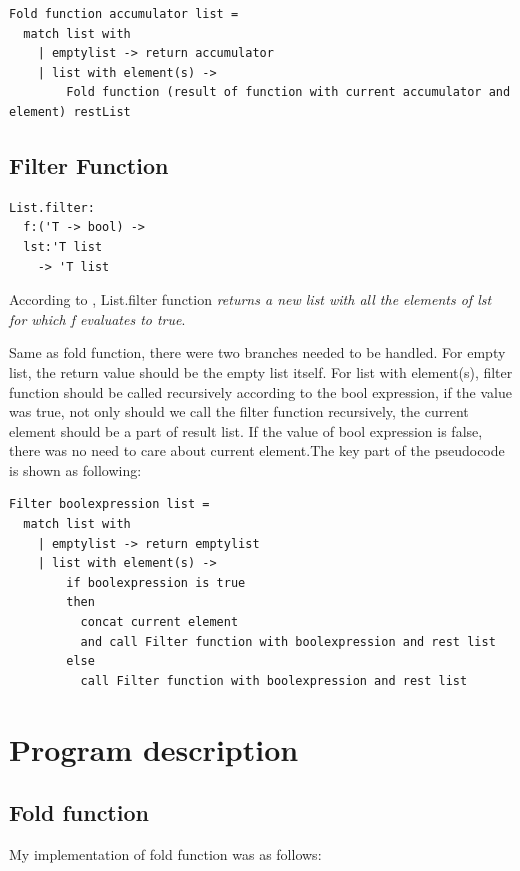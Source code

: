 \documentclass[sigconf]{acmart}
\begin{document}
\begin{lstlisting}
Fold function accumulator list =
  match list with
    | emptylist -> return accumulator
    | list with element(s) -> 
        Fold function (result of function with current accumulator and element) restList
\end{lstlisting}

\subsection{Filter Function}

\lstset{language=Csh}
\begin{lstlisting}
List.filter: 
  f:('T -> bool) -> 
  lst:'T list 
    -> 'T list
\end{lstlisting}

According to \cite{sporring2019}, List.filter function \emph{returns a new list with all the elements of lst for which f evaluates to true}. 

Same as fold function, there were two branches needed to be handled. For empty list, the return value should be the empty list itself. For list with element(s), filter function should be called recursively according to the bool expression, if the value was true, not only should we call the filter function recursively, the current element should be a part of result list. If the value of bool expression is false, there was no need to care about current element.The key part of the pseudocode is shown as following:

\begin{lstlisting}
Filter boolexpression list =
  match list with
    | emptylist -> return emptylist
    | list with element(s) -> 
        if boolexpression is true
        then
          concat current element 
          and call Filter function with boolexpression and rest list
        else
          call Filter function with boolexpression and rest list  

\end{lstlisting}

\section{Program description}

\subsection{Fold function}

My implementation of fold function was as follows:
\end{document}
